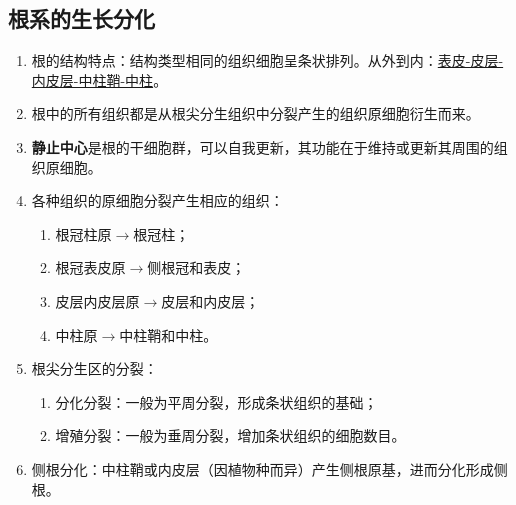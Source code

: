 \subsection{根系的生长分化}
\begin{enumerate}
    \item 根的结构特点：结构类型相同的组织细胞呈条状排列。从外到内：\uline{表皮-皮层-内皮层-中柱鞘-中柱}。
    \item 根中的所有组织都是从根尖分生组织中分裂产生的组织原细胞衍生而来。
    \item \textbf{静止中心}是根的干细胞群，可以自我更新，其功能在于维持或更新其周围的组织原细胞。
    \item 各种组织的原细胞分裂产生相应的组织：
    \begin{enumerate}
        \item 根冠柱原$\to$根冠柱；
        \item 根冠表皮原$\to$侧根冠和表皮；
        \item 皮层内皮层原$\to$皮层和内皮层；
        \item 中柱原$\to$中柱鞘和中柱。
    \end{enumerate}
    \item 根尖分生区的分裂：
    \begin{enumerate}
        \item 分化分裂：一般为平周分裂，形成条状组织的基础；
        \item 增殖分裂：一般为垂周分裂，增加条状组织的细胞数目。
    \end{enumerate}
    \item 侧根分化：中柱鞘或内皮层（因植物种而异）产生侧根原基，进而分化形成侧根。
\end{enumerate}
